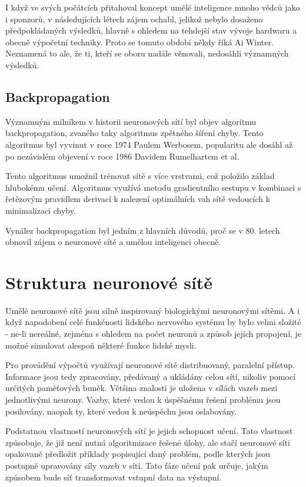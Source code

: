 I když ve svých počátcích přitahoval koncept umělé inteligence mnoho vědců jako
i sponzorů, v následujících létech zájem ochabl, jelikož nebylo dosaženo
předpokládaných výsledků, hlavně s ohledem na tehdejší stav vývoje hardwaru a
obecně výpočetní techniky. Proto se tomuto období někdy říká Ai Winter.
Neznamená to ale, že ti, kteří se oboru nadále věnovali, nedosáhli významných
výsledků. \cite{nn_history}

\subsection{Backpropagation}
Významným milníkem v historii neuronových sítí byl objev algoritmu
backpropagation, zvaného taky algoritmus zpětného šíření chyby. Tento
algoritmus byl vyvinut v roce 1974 Paulem Werbosem, popularitu ale dosáhl až po
nezávislém objevení v roce 1986 Davidem Rumelhartem et al.
\cite{backpropagation}

Tento algoritmus umožnil trénovat sítě s více vrstvami, což položilo základ
hlubokému učení. Algoritmus využívá metodu gradientního sestupu v kombinaci s
řetězovým pravidlem derivací k nalezení optimálních vah sítě vedoucích k
minimalizaci chyby.

Vynález backpropagation byl jedním z hlavních důvodů, proč se v 80. letech
obnovil zájem o neuronové sítě a umělou inteligenci obecně.

\section{Struktura neuronové sítě}

Umělé neuronové sítě jsou silně inspirovaný biologickými neuronovými sítěmi. A
i když napodobení celé funkčnosti lidského nervového systému by bylo velmi
složité - ne-li nereálné, zejména s ohledem na počet neuronů a způsob jejích
propojení, je možné simulovat alespoň některé funkce lidské mysli.

Pro provádění výpočtů využívají neuronové sítě distribuovaný, paralelní
přístup. Informace jsou tedy zpracovány, předávaný a ukládány celou sítí,
nikoliv pomocí určitých paměťových buněk. Většina znalosti je uložena v sílách
vazeb mezi jednotlivými neurony. Vazby, které vedou k úspěšnému řešení problému
jsou posilovány, naopak ty, které vedou k neúspěchu jsou oslabovány.

Podstatnou vlastností neuronových sítí je jejich schopnost učení. Tato
vlastnost způsobuje, že již není nutná algoritmizace řešené úlohy, ale stačí
neuronové síti opakovaně předložit příklady popisující daný problém, podle
kterých jsou postupně upravovány síly vazeb v síti. Tato fáze učení pak určuje,
jakým způsobem bude síť transformovat vstupní data na
výstupní.\cite{Vondrak1994}

